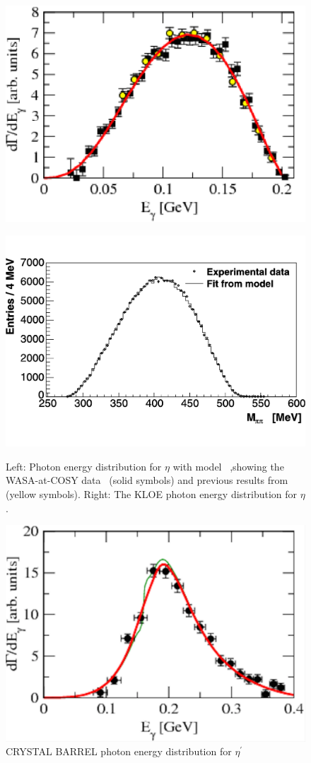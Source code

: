 \documentclass{aip-cp}
\begin{document}
\begin{figure}[h!]
	\centering
	\begin{minipage}{.30\textwidth}
		\centering
		\includegraphics[width=125 pt]{figures/WASA_eta.pdf}
		\caption{}{}
		\label{fig:wasa_eta}
	\end{minipage}%
	\centering
	\begin{minipage}{.30\textwidth}
		\centering
		\includegraphics[width=125 pt, height = 100 pt]{figures/KLOE_eta.pdf}
		\caption{Left: Photon energy distribution for $\eta$ with model~\cite{bib3} ,showing the WASA-at-COSY data~\cite{bib0} (solid symbols) and previous results from ~\cite{grom} (yellow symbols). Right: The KLOE photon energy distribution for $\eta$ \cite{bib1}.}{}
		\label{fig:kloe_eta}
	\end{minipage}
\end{figure}
\begin{figure}[h!]
	\centerline{\includegraphics[width=135 pt]{figures/CRYSTAL_etaP.pdf}}
	\caption{CRYSTAL BARREL photon energy distribution for  $\eta^{\prime}$~\cite{bib2}}
	\label{fig:crystal_etaP}
\end{figure}
\end{document}
